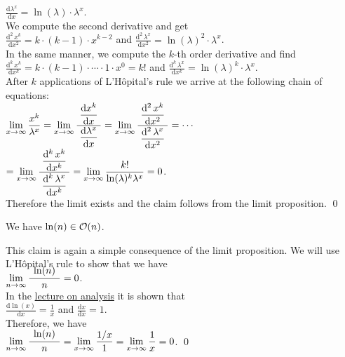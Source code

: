  $\displaystyle \frac{\mathrm{d}\lambda^{x}}{\mathrm{d}x} = \ln(\lambda) \cdot \lambda^x$. \\[0.2cm]
We compute the second derivative and get \\[0.2cm]
\hspace*{1.3cm}  
$\displaystyle \frac{\mathrm{d}^{2}\,x^{k}}{\mathrm{d}x^2} = k \cdot (k-1) \cdot x^{k-2}$ \quad and \quad 
 $\displaystyle \frac{\mathrm{d}^2\,\lambda^{x}}{\mathrm{d}x^2} = \ln(\lambda)^2 \cdot \lambda^x$. \\[0.2cm]
In the same manner, we compute the $k$-th order derivative and find \\[0.2cm]
\hspace*{1.3cm} 
$\displaystyle \frac{\mathrm{d}^{k}\,x^{k}}{\mathrm{d}x^k} = k \cdot (k-1) \cdot \cdots \cdot 1 \cdot x^{0} = k!$ \quad and \quad 
 $\displaystyle \frac{\mathrm{d}^k\,\lambda^{x}}{\mathrm{d}x^k} = \ln(\lambda)^k \cdot \lambda^x$. \\[0.2cm]
After $k$ applications of L'H\^opital's rule we arrive at the following chain of equations:
\\[0.2cm]
\hspace*{1.3cm} 
$\displaystyle 
\lim\limits_{x \rightarrow \infty} \frac{x^{k}}{\lambda^x} =
\lim\limits_{x \rightarrow \infty} \frac{\displaystyle\;\frac{\mathrm{d}x^{k}}{\mathrm{d}x}\;}{\displaystyle\frac{\mathrm{d}\lambda^x}{\mathrm{d}x}} =
\lim\limits_{x \rightarrow \infty} \frac{\displaystyle\;\frac{\mathrm{d}^2\,x^{k}}{\mathrm{d}x^2}\;}{\displaystyle\frac{\mathrm{d}^2\,\lambda^x}{\mathrm{d}x^2}} =
\cdots$
\\[0.3cm]
\hspace*{2.8cm}
$\displaystyle = 
\lim\limits_{x \rightarrow \infty} \frac{\displaystyle\;\frac{\mathrm{d}^k\,x^{k}}{\mathrm{d}x^k}\;}{\displaystyle\frac{\mathrm{d}^k\,\lambda^x}{\mathrm{d}x^k}} =
\lim\limits_{x \rightarrow \infty} \frac{k!}{\ln(\lambda)^k \lambda^x} = 0$.
\\[0.2cm] 
Therefore the limit exists and the claim follows from the limit proposition.
\qed

\example
We have $\ln(n) \in \mathcal{O}(n)$.

\proof
This claim is again a simple consequence of the limit proposition.  We will use L'H\^opital's rule
to show that we have
\\[0.4cm]
\hspace*{1.3cm} 
$\lim\limits_{n \rightarrow \infty} \bruch{\;\ln(n)\;}{n} = 0$.
\\[0.2cm]
In the \href{https://github.com/karlstroetmann/Analysis/blob/master/Skript/analysis.pdf}{lecture on analysis}
it is shown that \\[0.2cm] 
\hspace*{1.3cm} $\displaystyle \frac{\mathrm{d} \ln(x)}{\mathrm{d}x} = \frac{1}{x}$ 
\quad and \quad
 $\displaystyle \frac{\mathrm{d} x}{\mathrm{d}x} = 1$. \\[0.2cm]
Therefore, we have \\[0.2cm]
\hspace*{1.3cm} 
$\displaystyle \lim\limits_{n \rightarrow \infty} \bruch{\;\ln(n)\;}{n} = 
\lim\limits_{x \rightarrow \infty} \frac{1/x}{1} = 
\lim\limits_{x \rightarrow \infty} \frac{1}{x} = 0$. \qed


